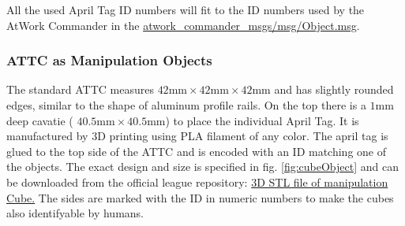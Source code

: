 All the used April Tag ID numbers will fit to the ID numbers used by the AtWork Commander in the \href{https://github.com/robocup-at-work/atwork-commander/blob/master/atwork_commander_msgs/msg/Object.msg}{atwork\_commander\_msgs/msg/Object.msg}. 
%
%
%
%
%


\subsubsection{ATTC as Manipulation Objects}

The standard ATTC measures $42\si{\milli\meter} \times 42\si{\milli\meter} \times 42 \si{\milli\meter}$ and has slightly rounded edges, similar to the shape of aluminum profile rails. On the top there is a $1\si{\milli\meter}$ deep cavatie ( $40.5\si{\milli\meter} \times 40.5\si{\milli\meter}$) to place the individual April Tag. It is manufactured by 3D printing using PLA filament of any color. The april tag is glued to the top side of the ATTC and is encoded with an ID matching one of the objects.
The exact design and size is specified in fig. \ref{fig:cubeObject} and can be downloaded from the official league repository: \href{https://github.com/robocup-at-work/rulebook/tree/alpha_2023/images}{3D STL file of manipulation Cube.}
The sides are marked with the ID in numeric numbers to make the cubes also identifyable by humans.

